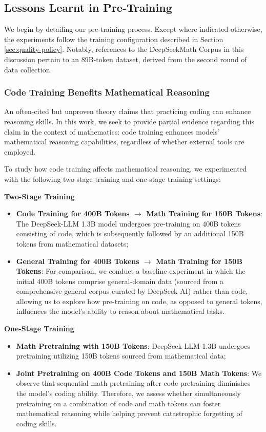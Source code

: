 \begin{itemize}[topsep=0pt]
\begin{itemize}[topsep=0pt]
\subsection{Lessons Learnt in Pre-Training}

We begin by detailing our pre-training process. Except where indicated otherwise, the experiments follow the training configuration described in Section \ref{sec:quality-policy}. Notably, references to the DeepSeekMath Corpus in this discussion pertain to an 89B-token dataset, derived from the second round of data collection.

\subsubsection{Code Training Benefits Mathematical Reasoning}

An often-cited but unproven theory claims that practicing coding can enhance reasoning skills. In this work, we seek to provide partial evidence regarding this claim in the context of mathematics: code training enhances models' mathematical reasoning capabilities, regardless of whether external tools are employed.

To study how code training affects mathematical reasoning, we experimented with the following two-stage training and one-stage training settings:

\textbf{Two-Stage Training}

\begin{itemize}[topsep=0pt]
    \item \textbf{Code Training for 400B Tokens $\rightarrow$ Math Training for 150B Tokens}: The DeepSeek-LLM 1.3B model undergoes pre-training on 400B tokens consisting of code, which is subsequently followed by an additional 150B tokens from mathematical datasets;
    \item \textbf{General Training for 400B Tokens $\rightarrow$ Math Training for 150B Tokens}: For comparison, we conduct a baseline experiment in which the initial 400B tokens comprise general-domain data (sourced from a comprehensive general corpus curated by DeepSeek-AI) rather than code, allowing us to explore how pre-training on code, as opposed to general tokens, influences the model’s ability to reason about mathematical tasks.
\end{itemize}

\textbf{One-Stage Training}

\begin{itemize}[topsep=0pt]
    \item \textbf{Math Pretraining with 150B Tokens}: DeepSeek-LLM 1.3B undergoes pretraining utilizing 150B tokens sourced from mathematical data;
    \item \textbf{Joint Pretraining on 400B Code Tokens and 150B Math Tokens}: We observe that sequential math pretraining after code pretraining diminishes the model's coding ability. Therefore, we assess whether simultaneously pretraining on a combination of code and math tokens can foster mathematical reasoning while helping prevent catastrophic forgetting of coding skills.
\end{itemize}


\end{itemize}
\end{itemize}
